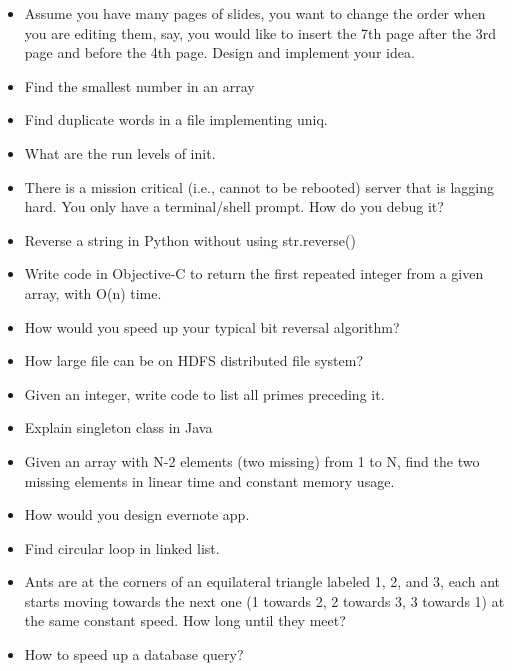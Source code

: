 \documentclass{article}
\begin{document}
\begin{itemize}
	\item Assume you have many pages of slides, you want to change the order when you are editing them, say, you would like to insert the 7th page after the 3rd page and before the 4th page. Design and implement your idea.
	\item Find the smallest number in an array
	\item Find duplicate words in a file implementing uniq.
	\item What are the run levels of init.
	\item There is a mission critical (i.e., cannot to be rebooted) server that is lagging hard. You only have a terminal/shell prompt. How do you debug it?
	\item Reverse a string in Python without using str.reverse()
	\item Write code in Objective-C to return the first repeated integer from a given array, with O(n) time.
	\item How would you speed up your typical bit reversal algorithm?
	\item How large file can be on HDFS distributed file system?
	\item Given an integer, write code to list all primes preceding it.
	\item Explain singleton class in Java
	\item Given an array with N-2 elements (two missing) from 1 to N, find the two missing elements in linear time and constant memory usage.
	\item How would you design evernote app.
	\item Find circular loop in linked list.
	\item Ants are at the corners of an equilateral triangle labeled 1, 2, and 3, each ant starts moving towards the next one (1 towards 2, 2 towards 3, 3 towards 1) at the same constant speed. How long until they meet?
	\item How to speed up a database query?	
\end{itemize}
\end{document}
